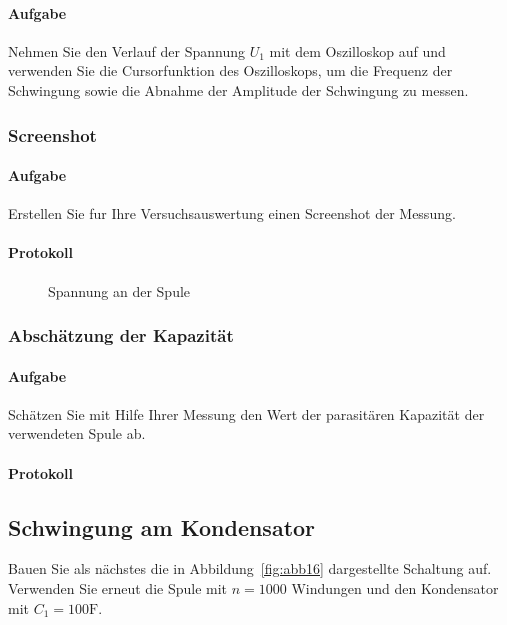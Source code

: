\documentclass[10pt]{report}
\begin{document}
        \paragraph{Aufgabe}
        Nehmen Sie den Verlauf der Spannung $U_1$ mit dem Oszilloskop auf und verwenden
        Sie die Cursorfunktion des Oszilloskops, um die Frequenz der Schwingung sowie die
        Abnahme der Amplitude der Schwingung zu messen.

        \subsubsection{Screenshot}
        \paragraph{Aufgabe}
        Erstellen Sie fur Ihre Versuchsauswertung einen Screenshot der Messung.

        \paragraph{Protokoll}
        \begin{center}
            \begin{figure}[H]
                \caption{Spannung an der Spule}
            \end{figure}
        \end{center}

        \subsubsection{Abschätzung der Kapazität}
        \paragraph{Aufgabe}
        Schätzen Sie mit Hilfe Ihrer Messung den Wert der parasitären Kapazität der
        verwendeten Spule ab.

        \paragraph{Protokoll}


        \subsection{Schwingung am Kondensator}
        Bauen Sie als nächstes die in Abbildung~\ref{fig:abb16} dargestellte Schaltung auf. Verwenden
        Sie erneut die Spule mit $n = 1000$ Windungen und den Kondensator mit $C_1 =
        100 \si{\farad}$.
\end{document}
